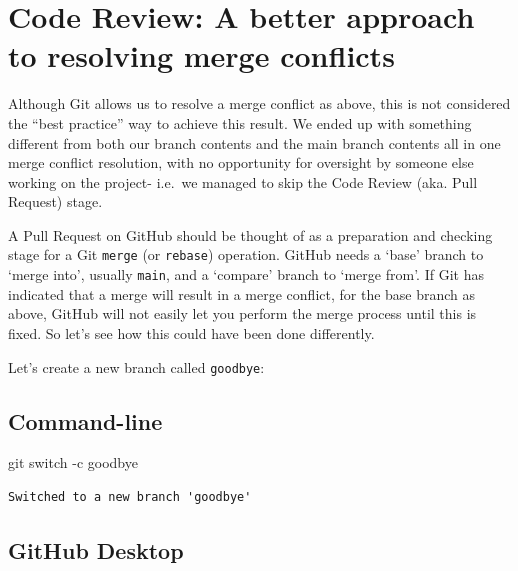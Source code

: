\documentclass[
  letterpaper,
  DIV=11,
  numbers=noendperiod]{scrartcl}
\newenvironment{Shaded}{\begin{snugshade}}{\end{snugshade}}
\newcommand{\ControlFlowTok}[1]{\textcolor[rgb]{0.00,0.23,0.31}{#1}}
\newcommand{\NormalTok}[1]{\textcolor[rgb]{0.00,0.23,0.31}{#1}}
\newcommand{\SpecialCharTok}[1]{\textcolor[rgb]{0.37,0.37,0.37}{#1}}
\begin{document}
\section{Code Review: A better approach to resolving merge
conflicts}\label{code-review-a-better-approach-to-resolving-merge-conflicts}

Although Git allows us to resolve a merge conflict as above, this is not
considered the ``best practice'' way to achieve this result. We ended up
with something different from both our branch contents and the main
branch contents all in one merge conflict resolution, with no
opportunity for oversight by someone else working on the project-
i.e.~we managed to skip the Code Review (aka. Pull Request) stage.

A Pull Request on GitHub should be thought of as a preparation and
checking stage for a Git \texttt{merge} (or \texttt{rebase}) operation.
GitHub needs a `base' branch to `merge into', usually \texttt{main}, and
a `compare' branch to `merge from'. If Git has indicated that a merge
will result in a merge conflict, for the base branch as above, GitHub
will not easily let you perform the merge process until this is fixed.
So let's see how this could have been done differently.

Let's create a new branch called \texttt{goodbye}:

\subsection{Command-line}

\begin{Shaded}
\begin{Highlighting}[]
\NormalTok{git }\ControlFlowTok{switch} \SpecialCharTok{{-}}\NormalTok{c goodbye}
\end{Highlighting}
\end{Shaded}

\begin{verbatim}
Switched to a new branch 'goodbye'
\end{verbatim}

\subsection{GitHub Desktop}
\end{document}
